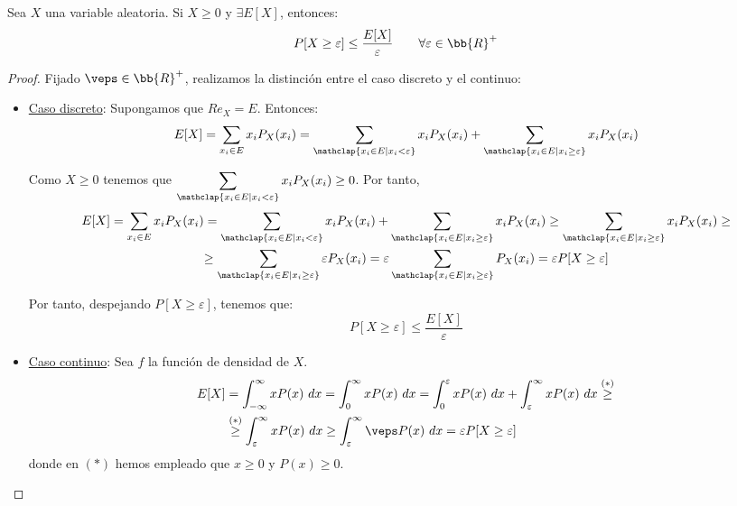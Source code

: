 \begin{teo}
    Sea $X$ una variable aleatoria. Si $X\geq 0$ y $\exists E[X]$, entonces:
    \begin{equation*}
        P[X\geq \varepsilon]\leq \dfrac{E[X]}{\varepsilon} \qquad \forall \varepsilon\in \bb{R}^+
    \end{equation*}
\end{teo}
\begin{proof}
    Fijado $\veps\in \bb{R}^+$, realizamos la distinción entre el caso discreto y el continuo:
    \begin{itemize}
        \item \underline{Caso discreto}: Supongamos que $Re_X=E$. Entonces:
        \begin{equation*}
            E[X]=\sum_{x_i\in E}x_iP_X(x_i)
            = \sum_{\mathclap{x_i\in E\mid x_i<\varepsilon}}x_iP_X(x_i) + \sum_{\mathclap{x_i\in E\mid x_i\geq \varepsilon}}x_iP_X(x_i)
        \end{equation*}

        Como $X\geq 0$ tenemos que $\displaystyle \sum\limits_{\mathclap{x_i\in E\mid x_i<\varepsilon}}x_iP_X(x_i)\geq 0$. Por tanto,
        \begin{multline*}
            E[X]
            =\sum_{x_i\in E}x_iP_X(x_i)
            = \sum_{\mathclap{x_i\in E\mid x_i<\varepsilon}}x_iP_X(x_i) + \sum_{\mathclap{x_i\in E\mid x_i\geq \varepsilon}}x_iP_X(x_i)
            \geq \sum_{\mathclap{x_i\in E\mid x_i\geq \varepsilon}}x_iP_X(x_i)
            \geq\\
            \geq \sum_{\mathclap{x_i\in E\mid x_i\geq \varepsilon}}\varepsilon P_X(x_i)
            = \varepsilon \sum_{\mathclap{x_i\in E\mid x_i\geq \varepsilon}} P_X(x_i)
            = \varepsilon P[X\geq \varepsilon]
        \end{multline*}

        Por tanto, despejando $P[X\geq \varepsilon]$, tenemos que:
        \begin{equation*}
            P[X\geq \varepsilon] \leq \frac{E[X]}{\varepsilon}
        \end{equation*}

        \item \underline{Caso continuo}: Sea $f$ la función de densidad de $X$.
        \begin{align*}
            E[X]
            &= \int_{-\infty}^\infty xP(x)~dx
            = \int_0^\infty xP(x)~dx
            =\int_0^\varepsilon xP(x)~dx + \int_\varepsilon^\infty xP(x)~dx
            \stackrel{(\ast)}{\geq} \\&\stackrel{(\ast)}{\geq} \int_\varepsilon^\infty xP(x)~dx
            \geq \int_\varepsilon^\infty \veps P(x)~dx            
            = \varepsilon P[X\geq \varepsilon]
        \end{align*}
        donde en $(\ast)$ hemos empleado que $x\geq 0$ y $P(x)\geq 0$.


\end{itemize}
\end{proof}
